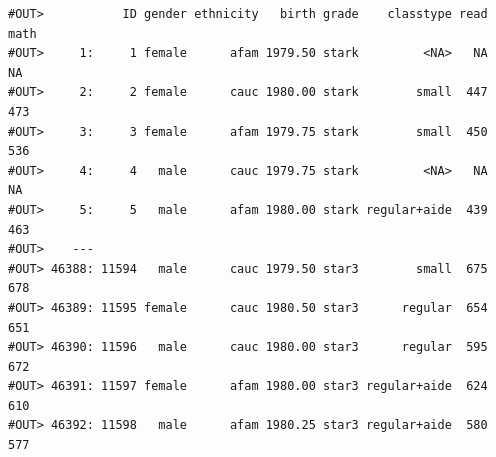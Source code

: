 \documentclass[]{book}
\newenvironment{Shaded}{\begin{snugshade}}{\end{snugshade}}
\newcommand{\CommentTok}[1]{\textcolor[rgb]{0.56,0.35,0.01}{\textit{#1}}}
\newcommand{\DataTypeTok}[1]{\textcolor[rgb]{0.13,0.29,0.53}{#1}}
\newcommand{\DecValTok}[1]{\textcolor[rgb]{0.00,0.00,0.81}{#1}}
\newcommand{\ErrorTok}[1]{\textcolor[rgb]{0.64,0.00,0.00}{\textbf{#1}}}
\newcommand{\KeywordTok}[1]{\textcolor[rgb]{0.13,0.29,0.53}{\textbf{#1}}}
\newcommand{\NormalTok}[1]{#1}
\newcommand{\OperatorTok}[1]{\textcolor[rgb]{0.81,0.36,0.00}{\textbf{#1}}}
\newcommand{\StringTok}[1]{\textcolor[rgb]{0.31,0.60,0.02}{#1}}
\begin{document}
\begin{Shaded}
\end{Shaded}

\begin{verbatim}
#OUT>           ID gender ethnicity   birth grade    classtype read math
#OUT>     1:     1 female      afam 1979.50 stark         <NA>   NA   NA
#OUT>     2:     2 female      cauc 1980.00 stark        small  447  473
#OUT>     3:     3 female      afam 1979.75 stark        small  450  536
#OUT>     4:     4   male      cauc 1979.75 stark         <NA>   NA   NA
#OUT>     5:     5   male      afam 1980.00 stark regular+aide  439  463
#OUT>    ---                                                            
#OUT> 46388: 11594   male      cauc 1979.50 star3        small  675  678
#OUT> 46389: 11595 female      cauc 1980.50 star3      regular  654  651
#OUT> 46390: 11596   male      cauc 1980.00 star3      regular  595  672
#OUT> 46391: 11597 female      afam 1980.00 star3 regular+aide  624  610
#OUT> 46392: 11598   male      afam 1980.25 star3 regular+aide  580  577
\end{verbatim}
\end{document}

